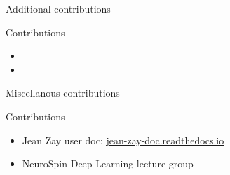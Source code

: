 \documentclass[aspectratio=169,xcolor=dvipsnames]{beamer}
\begin{document}
\begin{frame}{Additional contributions}
    \begin{exampleblock}{Contributions}
        \begin{itemize}
            \item {}
            \item {}
        \end{itemize}
    \end{exampleblock}
\end{frame}

\begin{frame}{Miscellanous contributions}
    \begin{exampleblock}{Contributions}
        \begin{itemize}
            \item Jean Zay user doc: \href{https://jean-zay-doc.readthedocs.io/}{jean-zay-doc.readthedocs.io}
            \item NeuroSpin Deep Learning lecture group
        \end{itemize}
    \end{exampleblock}
\end{frame}
\end{document}
